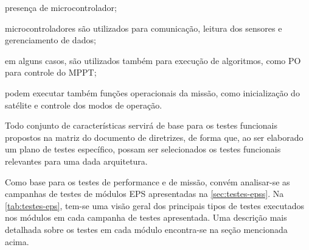 \begin{alineas}
    \item presença de microcontrolador;
    \begin{alineas}
        \item microcontroladores são utilizados para comunicação, leitura dos sensores e gerenciamento de dados;
        \item em alguns casos, são utilizados também para execução de algoritmos, como \gls{PO} para controle do \gls{MPPT};
        \item podem executar também funções operacionais da missão, como inicialização do satélite e controle dos modos de operação.
    \end{alineas}
\end{alineas}

Todo conjunto de características servirá de base para os testes funcionais propostos na matriz do documento de diretrizes, de forma que, ao ser elaborado um plano de testes específico, possam ser selecionados os testes funcionais relevantes para uma dada arquitetura.

Como base para os testes de performance e de missão, convém analisar-se as campanhas de testes de módulos \gls{EPS} apresentadas na \autoref{sec:testes-epss}.
Na \autoref{tab:testes-eps}, tem-se uma visão geral dos principais tipos de testes executados nos módulos em cada campanha de testes apresentada.
Uma descrição mais detalhada sobre os testes em cada módulo encontra-se na seção mencionada acima.



